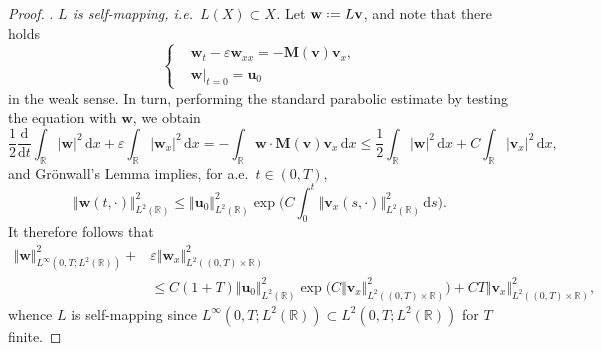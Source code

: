 \documentclass[11pt,a4paper,reqno]{amsart}
\numberwithin{equation}{section}
\theoremstyle{definition}
\theoremstyle{remark}
\newcommand{\bu}{\mathbf{u}}
\newcommand{\bv}{\mathbf{v}}
\newcommand{\bw}{\mathbf{w}}
\renewcommand{\d}{\, \mathrm{d}}
\newcommand{\der}{\mathrm{d}}
\newcommand{\bM}{\mathbf{M}}
\renewcommand{\leq}{\leqslant}
\newcommand*{\defeq}{\mathrel{\vcenter{\baselineskip0.5ex \lineskiplimit0pt
                     \hbox{\scriptsize.}\hbox{\scriptsize.}}}%
                     =}
\begin{document}
{\begin{proof}
 . \textit{$L$ is self-mapping, i.e.~$L(X) \subset X$.}  Let $\bw \defeq L\bv$, and note that there holds 
\begin{equation*}
    \left\lbrace\begin{aligned}
    &\bw_t - \varepsilon\bw_{xx} = - \bM(\bv)\bv_x, \\ 
    &\bw|_{t=0} = \bu_0 
    \end{aligned}\right. 
\end{equation*}
in the weak sense. In turn, performing the standard parabolic estimate by testing the equation with $\bw$, we obtain 
\begin{equation*}
    \frac{1}{2}\frac{\der}{\der t}\int_\mathbb{R} |\bw|^2 \d x + \varepsilon \int_\mathbb{R} |\bw_x|^2 \d x = -\int_{\mathbb{R}} \bw \cdot \bM(\bv)\bv_x \d x \leq \frac{1}{2}\int_\mathbb{R} |\bw|^2 \d x + C\int_\mathbb{R}|\bv_x|^2 \d x, 
\end{equation*}
and Gr\"onwall's Lemma implies, for a.e.~$t \in (0,T)$, 
\begin{equation*}
    \Vert \bw (t,\cdot) \Vert^2_{L^2(\mathbb{R})} \leq \Vert \bu_0 \Vert^2_{L^2(\mathbb{R})} \exp\Big( C \int_0^t \Vert \bv_x(s,\cdot) \Vert^2_{L^2(\mathbb{R})} \d s \Big). 
\end{equation*}
It therefore follows that 
\begin{equation}\label{eq:L2H1 est fixed point}
    \begin{aligned} \Vert \bw \Vert^2_{L^\infty(0,T;L^2(\mathbb{R}))} + & \varepsilon \Vert \bw_x \Vert^2_{L^2((0,T)\times\mathbb{R})} \\ 
    &\leq C(1+T)\Vert \bu_0 \Vert^2_{L^2(\mathbb{R})} \exp\Big( C \Vert \bv_x \Vert^2_{L^2((0,T)\times\mathbb{R})}  \Big) + CT \Vert \bv_x \Vert^2_{L^2((0,T)\times\mathbb{R})}, 
    \end{aligned}
\end{equation}
whence $L$ is self-mapping since $L^\infty(0,T;L^2(\mathbb{R})) \subset L^2(0,T;L^2(\mathbb{R}))$ for $T$ finite. 



\end{proof}}
\end{document}
